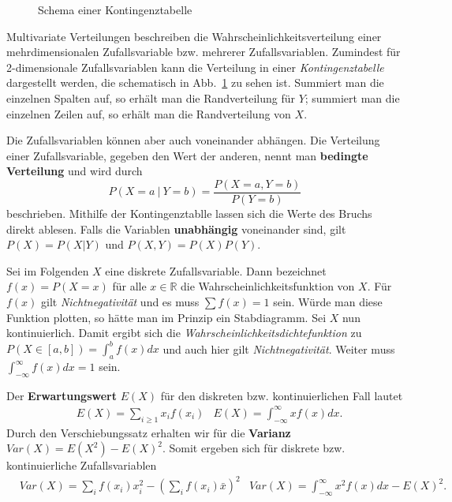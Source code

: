 \begin{figure}[hb]
	\centering
	
	\caption[Schema Kontingenztabelle]{Schema einer Kontingenztabelle}
	\label{fig:contingency_ex}
\end{figure}

Multivariate Verteilungen beschreiben die Wahrscheinlichkeitsverteilung einer mehrdimensionalen Zufallsvariable bzw. mehrerer Zufallsvariablen. Zumindest für 2-dimensionale Zufallsvariablen kann die Verteilung in einer \textit{Kontingenztabelle} dargestellt werden, die schematisch in Abb.~\ref{fig:contingency_ex} zu sehen ist. Summiert man die einzelnen Spalten auf, so erhält man die Randverteilung für \(Y\); summiert man die einzelnen Zeilen auf, so erhält man die Randverteilung von \(X\).

Die Zufallsvariablen können aber auch voneinander abhängen. Die Verteilung
einer Zufallsvariable, gegeben den Wert der anderen, nennt man \textbf{bedingte
Verteilung} und wird durch
\[
	P(X=a\ |\ Y=b)=\frac{P(X=a,Y=b)}{P(Y=b)}
\]
beschrieben. Mithilfe der Kontingenztablle lassen sich die Werte des Bruchs direkt ablesen. Falls die Variablen \textbf{unabhängig} voneinander sind, gilt \(P(X) = P(X|Y)\) und \(P(X,Y) = P(X)P(Y)\).

Sei im Folgenden \(X\) eine diskrete Zufallsvariable. Dann bezeichnet \(f(x)=P(X=x)\) für alle \(x\in\mathbb{R}\) die Wahrscheinlichkeitsfunktion von \(X\). Für \(f(x)\) gilt \textit{Nichtnegativität} und es muss \(\sum f(x) = 1\) sein. Würde man diese Funktion plotten, so hätte man im Prinzip ein Stabdiagramm.
Sei \(X\) nun kontinuierlich. Damit ergibt sich die \textit{Wahrscheinlichkeitsdichtefunktion} zu \(P(X\in[a,b])=\int_{a}^{b} f(x)dx\) und auch hier gilt \textit{Nichtnegativität}. Weiter muss \(\int_{-\infty}^{\infty} f(x)dx = 1\) sein.

Der \textbf{Erwartungswert} \(E(X)\) für den diskreten bzw. kontinuierlichen Fall lautet
\begin{align*}
	&E(X)=\sum_{i\geq 1} x_i f(x_i) &E(X) = \int_{-\infty}^{\infty}xf(x)dx.
\end{align*}
Durch den Verschiebungssatz erhalten wir für die \textbf{Varianz} \(Var(X)=E(X^2)-E(X)^2\). Somit ergeben sich für diskrete bzw. kontinuierliche Zufallsvariablen
\begin{align*}
	&Var(X)=\sum_i f(x_i) x_i^2 - (\sum_i f(x_i) \bar{x})^2&Var(X)=\int_{-\infty}^{\infty} x^2f(x)dx - E(X)^2.
\end{align*}

